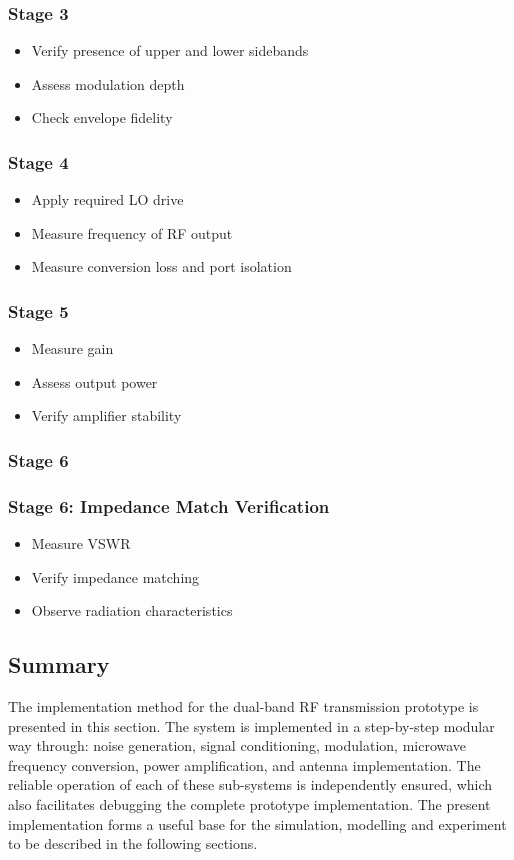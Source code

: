 \documentclass[12pt,a4paper]{report}
\begin{document}
	\subsubsection{Stage 3}
	\begin{itemize}
		\item Verify presence of upper and lower sidebands
		\item Assess modulation depth
		\item Check envelope fidelity
	\end{itemize}
	\subsubsection{Stage 4}
	\begin{itemize}
		\item Apply required LO drive
		\item Measure frequency of RF output
		\item Measure conversion loss and port isolation
	\end{itemize}
	\subsubsection{Stage 5}
	\begin{itemize}
	\item Measure gain
	\item Assess output power
	\item Verify amplifier stability
	\end{itemize}
	\subsubsection{Stage 6}
	\subsubsection{Stage 6: Impedance Match Verification}
	\begin{itemize}
		\item Measure VSWR
		\item Verify impedance matching
		\item Observe radiation characteristics
	\end{itemize}
	\subsection{Summary}
	The implementation method for the dual-band RF transmission prototype is presented in this section. The system is implemented in a step-by-step modular way through: noise generation, signal conditioning, modulation, microwave frequency conversion, power amplification, and antenna implementation. The reliable operation of each of these sub-systems is independently ensured, which also facilitates debugging the complete prototype implementation. The present implementation forms a useful base for the simulation, modelling and experiment to be described in the following sections.
\end{document}
